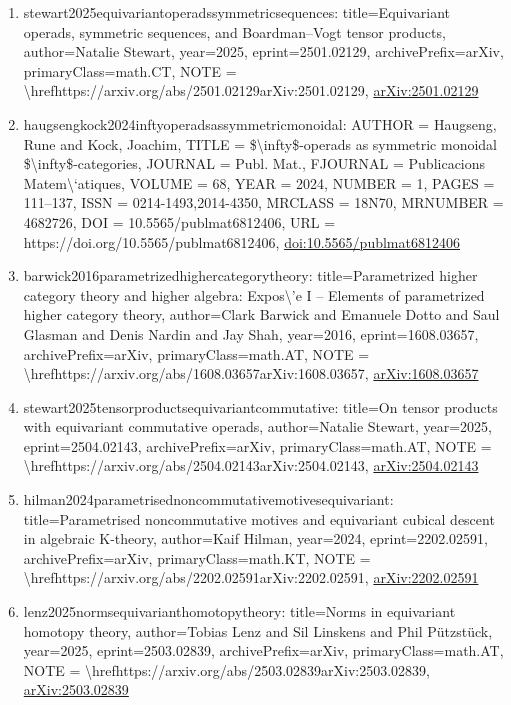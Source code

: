 \documentclass[11pt]{article}
\begin{document}
\begin{enumerate}[leftmargin=*]
  \item stewart2025equivariantoperadssymmetricsequences: title=Equivariant operads, symmetric sequences, and Boardman--Vogt tensor products, author=Natalie Stewart, year=2025, eprint=2501.02129, archivePrefix=arXiv, primaryClass=math.CT, NOTE = \textbackslash{}hrefhttps://arxiv.org/abs/2501.02129arXiv:2501.02129, \href{https://arxiv.org/abs/2501.02129}{arXiv:2501.02129}
  \item haugsengkock2024inftyoperadsassymmetricmonoidal: AUTHOR = Haugseng, Rune and Kock, Joachim, TITLE = \$\textbackslash{}infty\$-operads as symmetric monoidal \$\textbackslash{}infty\$-categories, JOURNAL = Publ. Mat., FJOURNAL = Publicacions Matem\textbackslash{}`atiques, VOLUME = 68, YEAR = 2024, NUMBER = 1, PAGES = 111--137, ISSN = 0214-1493,2014-4350, MRCLASS = 18N70, MRNUMBER = 4682726, DOI = 10.5565/publmat6812406, URL = https://doi.org/10.5565/publmat6812406, \href{https://doi.org/10.5565/publmat6812406}{doi:10.5565/publmat6812406}
  \item barwick2016parametrizedhighercategorytheory: title=Parametrized higher category theory and higher algebra: Expos\textbackslash{}'e I -- Elements of parametrized higher category theory, author=Clark Barwick and Emanuele Dotto and Saul Glasman and Denis Nardin and Jay Shah, year=2016, eprint=1608.03657, archivePrefix=arXiv, primaryClass=math.AT, NOTE = \textbackslash{}hrefhttps://arxiv.org/abs/1608.03657arXiv:1608.03657, \href{https://arxiv.org/abs/1608.03657}{arXiv:1608.03657}
  \item stewart2025tensorproductsequivariantcommutative: title=On tensor products with equivariant commutative operads, author=Natalie Stewart, year=2025, eprint=2504.02143, archivePrefix=arXiv, primaryClass=math.AT, NOTE = \textbackslash{}hrefhttps://arxiv.org/abs/2504.02143arXiv:2504.02143, \href{https://arxiv.org/abs/2504.02143}{arXiv:2504.02143}
  \item hilman2024parametrisednoncommutativemotivesequivariant: title=Parametrised noncommutative motives and equivariant cubical descent in algebraic K-theory, author=Kaif Hilman, year=2024, eprint=2202.02591, archivePrefix=arXiv, primaryClass=math.KT, NOTE = \textbackslash{}hrefhttps://arxiv.org/abs/2202.02591arXiv:2202.02591, \href{https://arxiv.org/abs/2202.02591}{arXiv:2202.02591}
  \item lenz2025normsequivarianthomotopytheory: title=Norms in equivariant homotopy theory, author=Tobias Lenz and Sil Linskens and Phil Pützstück, year=2025, eprint=2503.02839, archivePrefix=arXiv, primaryClass=math.AT, NOTE = \textbackslash{}hrefhttps://arxiv.org/abs/2503.02839arXiv:2503.02839, \href{https://arxiv.org/abs/2503.02839}{arXiv:2503.02839}

\end{enumerate}
\end{document}

